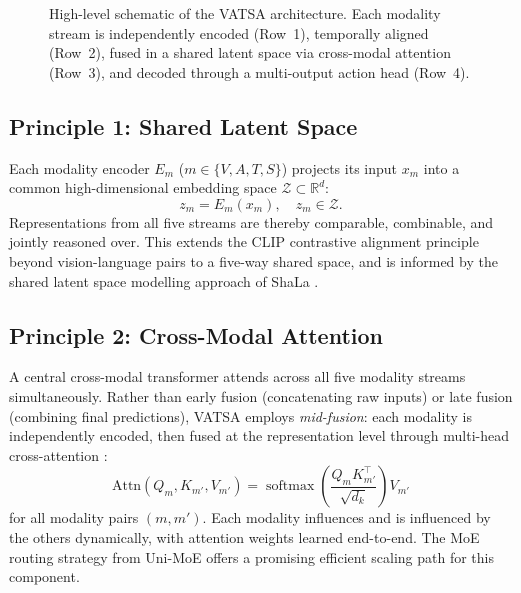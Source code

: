 \documentclass[11pt,a4paper]{article}
\begin{document}
\begin{figure}[ht]
\caption{High-level schematic of the VATSA architecture.  Each modality stream is
independently encoded (Row~1), temporally aligned (Row~2), fused in a shared latent
space via cross-modal attention (Row~3), and decoded through a multi-output action
head (Row~4).}
\label{fig:arch}
\end{figure}

\subsection{Principle 1: Shared Latent Space}
\label{subsec:latent}

Each modality encoder $E_m$ ($m \in \{V, A, T, S\}$) projects its input $x_m$ into a
common high-dimensional embedding space $\mathcal{Z} \subset \mathbb{R}^d$:
\[
  z_m = E_m(x_m), \quad z_m \in \mathcal{Z}.
\]
Representations from all five streams are thereby comparable, combinable, and jointly
reasoned over.  This extends the CLIP contrastive alignment principle
\citep{radford2021clip} beyond vision-language pairs to a five-way shared space, and
is informed by the shared latent space modelling approach of ShaLa
\citep{cui2025shala}.

\subsection{Principle 2: Cross-Modal Attention}
\label{subsec:crossattn}

A central cross-modal transformer attends across all five modality streams
simultaneously.  Rather than early fusion (concatenating raw inputs) or late fusion
(combining final predictions), VATSA employs \emph{mid-fusion}: each modality is
independently encoded, then fused at the representation level through multi-head
cross-attention \citep{vaswani2017attention}:
\[
  \text{Attn}(Q_m, K_{m'}, V_{m'})
  = \operatorname{softmax}\!\left(\frac{Q_m K_{m'}^\top}{\sqrt{d_k}}\right) V_{m'}
\]
for all modality pairs $(m, m')$.  Each modality influences and is influenced by the
others dynamically, with attention weights learned end-to-end.  The MoE routing
strategy from Uni-MoE \citep{li2024unimoe} offers a promising efficient scaling path
for this component.
\end{document}
